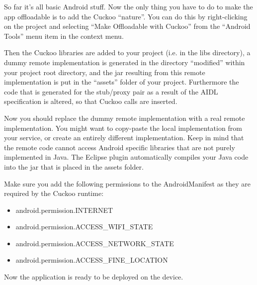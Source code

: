 \documentclass{article}
\begin{document}
So far it's all basic Android stuff. Now the only thing you have to do to make
the app offloadable is to add the Cuckoo ``nature''. You can do this by
right-clicking on the project and selecting ``Make Offloadable with Cuckoo''
from the ``Android Tools'' menu item in the context menu.

Then the Cuckoo libraries are added to your project (i.e. in the libs
directory), a dummy remote implementation is generated in the directory ``modified'' within
your project root directory, and the jar resulting from this remote
implementation is put in the ``assets'' folder of your project. Furthermore the
code that is generated for the stub/proxy pair as a result of the AIDL
specification is altered, so that Cuckoo calls are inserted.

Now you should replace the dummy remote implementation with a real remote
implementation. You might want to copy-paste the local implementation from your
service, or create an entirely different implementation. Keep in mind that the
remote code cannot access Android specific libraries that are not purely
implemented in Java. The Eclipse plugin automatically compiles your Java code
into the jar that is placed in the assets folder.

Make sure you add the following permissions to the AndroidManifest as they are
required by the Cuckoo runtime:

\begin{itemize}
\item  android.permission.INTERNET
\item  android.permission.ACCESS\_WIFI\_STATE
\item  android.permission.ACCESS\_NETWORK\_STATE
\item  android.permission.ACCESS\_FINE\_LOCATION
\end{itemize}

Now the application is ready to be deployed on the device.
\end{document}
